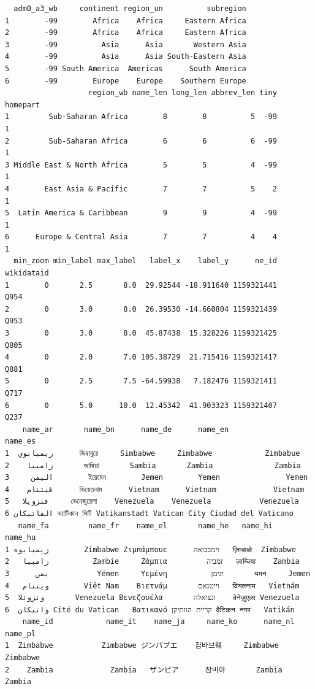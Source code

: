 \documentclass[
  letterpaper,
  DIV=11,
  numbers=noendperiod,
  oneside]{scrreprt}
\begin{document}
\begin{verbatim}
  adm0_a3_wb     continent region_un          subregion
1        -99        Africa    Africa     Eastern Africa
2        -99        Africa    Africa     Eastern Africa
3        -99          Asia      Asia       Western Asia
4        -99          Asia      Asia South-Eastern Asia
5        -99 South America  Americas      South America
6        -99        Europe    Europe    Southern Europe
                   region_wb name_len long_len abbrev_len tiny homepart
1         Sub-Saharan Africa        8        8          5  -99        1
2         Sub-Saharan Africa        6        6          6  -99        1
3 Middle East & North Africa        5        5          4  -99        1
4        East Asia & Pacific        7        7          5    2        1
5  Latin America & Caribbean        9        9          4  -99        1
6      Europe & Central Asia        7        7          4    4        1
  min_zoom min_label max_label   label_x    label_y      ne_id wikidataid
1        0       2.5       8.0  29.92544 -18.911640 1159321441       Q954
2        0       3.0       8.0  26.39530 -14.660804 1159321439       Q953
3        0       3.0       8.0  45.87438  15.328226 1159321425       Q805
4        0       2.0       7.0 105.38729  21.715416 1159321417       Q881
5        0       2.5       7.5 -64.59938   7.182476 1159321411       Q717
6        0       5.0      10.0  12.45342  41.903323 1159321407       Q237
    name_ar       name_bn      name_de      name_en             name_es
1  زيمبابوي      জিম্বাবুয়ে     Simbabwe     Zimbabwe            Zimbabue
2    زامبيا       জাম্বিয়া       Sambia       Zambia              Zambia
3     اليمن        ইয়েমেন        Jemen        Yemen               Yemen
4    فيتنام      ভিয়েতনাম      Vietnam      Vietnam             Vietnam
5   فنزويلا     ভেনেজুয়েলা    Venezuela    Venezuela           Venezuela
6 الفاتيكان ভ্যাটিকান সিটি Vatikanstadt Vatican City Ciudad del Vaticano
   name_fa         name_fr    name_el       name_he   name_hi   name_hu
1 زیمبابوه        Zimbabwe Ζιμπάμπουε      זימבבואה   ज़िम्बाब्वे  Zimbabwe
2   زامبیا          Zambie     Ζάμπια         זמביה   ज़ाम्बिया    Zambia
3      یمن           Yémen     Υεμένη          תימן       यमन     Jemen
4   ویتنام        Viêt Nam    Βιετνάμ       וייטנאם   वियतनाम   Vietnám
5  ونزوئلا       Venezuela Βενεζουέλα       ונצואלה    वेनेज़ुएला Venezuela
6  واتیکان Cité du Vatican   Βατικανό קריית הוותיקן वैटिकन नगर   Vatikán
    name_id            name_it    name_ja     name_ko      name_nl   name_pl
1  Zimbabwe           Zimbabwe ジンバブエ    짐바브웨     Zimbabwe  Zimbabwe
2    Zambia             Zambia   ザンビア      잠비아       Zambia    Zambia

\end{verbatim}
\end{document}
